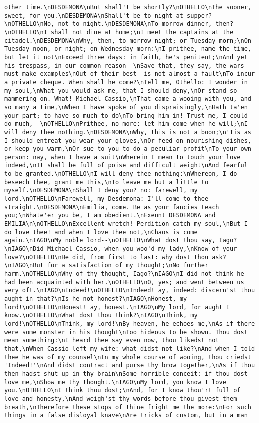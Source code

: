 \begin{verbatim}
other time.\nDESDEMONA\nBut shall't be shortly?\nOTHELLO\nThe sooner, sweet, for you.\nDESDEMONA\nShall't be to-night at supper?\nOTHELLO\nNo, not to-night.\nDESDEMONA\nTo-morrow dinner, then?\nOTHELLO\nI shall not dine at home;\nI meet the captains at the citadel.\nDESDEMONA\nWhy, then, to-morrow night; or Tuesday morn;\nOn Tuesday noon, or night; on Wednesday morn:\nI prithee, name the time, but let it not\nExceed three days: in faith, he's penitent;\nAnd yet his trespass, in our common reason--\nSave that, they say, the wars must make examples\nOut of their best--is not almost a fault\nTo incur a private cheque. When shall he come?\nTell me, Othello: I wonder in my soul,\nWhat you would ask me, that I should deny,\nOr stand so mammering on. What! Michael Cassio,\nThat came a-wooing with you, and so many a time,\nWhen I have spoke of you dispraisingly,\nHath ta'en your part; to have so much to do\nTo bring him in! Trust me, I could do much,--\nOTHELLO\nPrithee, no more: let him come when he will;\nI will deny thee nothing.\nDESDEMONA\nWhy, this is not a boon;\n'Tis as I should entreat you wear your gloves,\nOr feed on nourishing dishes, or keep you warm,\nOr sue to you to do a peculiar profit\nTo your own person: nay, when I have a suit\nWherein I mean to touch your love indeed,\nIt shall be full of poise and difficult weight\nAnd fearful to be granted.\nOTHELLO\nI will deny thee nothing:\nWhereon, I do beseech thee, grant me this,\nTo leave me but a little to myself.\nDESDEMONA\nShall I deny you? no: farewell, my lord.\nOTHELLO\nFarewell, my Desdemona: I'll come to thee straight.\nDESDEMONA\nEmilia, come. Be as your fancies teach you;\nWhate'er you be, I am obedient.\nExeunt DESDEMONA and EMILIA\n\nOTHELLO\nExcellent wretch! Perdition catch my soul,\nBut I do love thee! and when I love thee not,\nChaos is come again.\nIAGO\nMy noble lord--\nOTHELLO\nWhat dost thou say, Iago?\nIAGO\nDid Michael Cassio, when you woo'd my lady,\nKnow of your love?\nOTHELLO\nHe did, from first to last: why dost thou ask?\nIAGO\nBut for a satisfaction of my thought;\nNo further harm.\nOTHELLO\nWhy of thy thought, Iago?\nIAGO\nI did not think he had been acquainted with her.\nOTHELLO\nO, yes; and went between us very oft.\nIAGO\nIndeed!\nOTHELLO\nIndeed! ay, indeed: discern'st thou aught in that?\nIs he not honest?\nIAGO\nHonest, my lord!\nOTHELLO\nHonest! ay, honest.\nIAGO\nMy lord, for aught I know.\nOTHELLO\nWhat dost thou think?\nIAGO\nThink, my lord!\nOTHELLO\nThink, my lord!\nBy heaven, he echoes me,\nAs if there were some monster in his thought\nToo hideous to be shown. Thou dost mean something:\nI heard thee say even now, thou likedst not that,\nWhen Cassio left my wife: what didst not like?\nAnd when I told thee he was of my counsel\nIn my whole course of wooing, thou criedst 'Indeed!'\nAnd didst contract and purse thy brow together,\nAs if thou then hadst shut up in thy brain\nSome horrible conceit: if thou dost love me,\nShow me thy thought.\nIAGO\nMy lord, you know I love you.\nOTHELLO\nI think thou dost;\nAnd, for I know thou'rt full of love and honesty,\nAnd weigh'st thy words before thou givest them breath,\nTherefore these stops of thine fright me the more:\nFor such things in a false disloyal knave\nAre tricks of custom, but in a man 
\end{verbatim}
